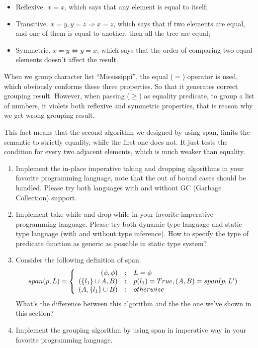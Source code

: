 \documentclass[b5paper]{article}
\begin{document}
\begin{itemize}
\item Reflexive. $x = x$, which says that any element is equal to itself;
\item Transitive. $x = y, y = z \Rightarrow x = z$, which says that if two elements are equal, and one of them is equal to another, then all the tree are equal;
\item Symmetric. $x = y \Leftrightarrow y = x$, which says that the order of comparing two equal elements doesn't affect the result.
\end{itemize}

When we group character list ``Mississippi'', the equal ($=$) operator is used, which obviously conforms these
three properties. So that it generates correct grouping result. However, when passing ($\geq$) as equality predicate,
to group a list of numbers, it violets both reflexive and symmetric properties, that is reason why we get wrong grouping result.

This fact means that the second algorithm we designed by using span, limits the semantic to strictly equality, while the
first one does not. It just tests the condition for every two adjacent elements, which is much weaker than equality.

\begin{Exercise}
\begin{enumerate}
\item Implement the in-place imperative taking and dropping algorithms in your favorite programming language, note that
the out of bound cases should be handled. Please try both languages with and without GC (Garbage Collection) support.
\item Implement take-while and drop-while in your favorite imperative programming language. Please try both dynamic
type language and static type language (with and without type inference). How to specify the type of predicate function
as generic as possible in static type system?
\item Consider the following definition of span.
\[
span(p, L) =  \left \{
  \begin{array}
  {r@{\quad:\quad}l}
  (\phi, \phi) & L = \phi \\
  (\{ l_1 \} \cup A, B) & p(l_1) = True, (A, B) = span(p, L') \\
  (A, \{l_1\} \cup B) & otherwise
  \end{array}
\right.
\]
What's the difference between this algorithm and the the one we've shown in this section?
\item Implement the grouping algorithm by using span in imperative way in your favorite programming language.
\end{enumerate}
\end{Exercise}
\end{document}
